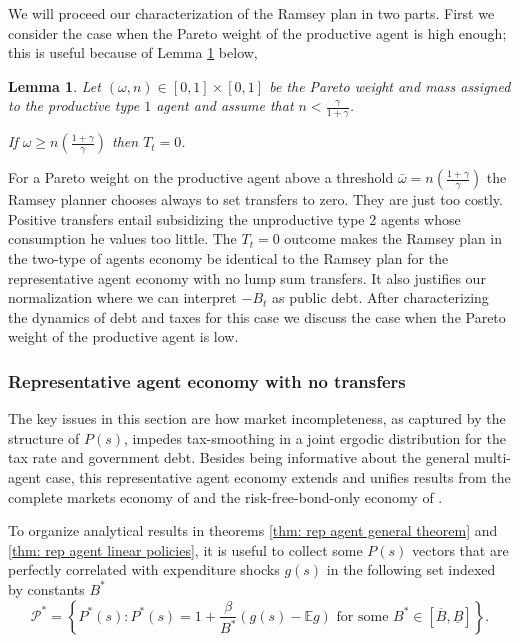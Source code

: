 \documentclass[thmsb,11pt]{article}
\newtheorem{lemma}{Lemma}
\begin{document}
We will proceed our characterization of the Ramsey plan in two parts. First we consider the case when the Pareto weight of the productive agent is high enough; this is useful because of Lemma \ref{lemma threshold} below,
\begin{lemma}
\label{lemma threshold}
Let $(\omega,n) \in [0,1] \times [0,1]$ be the Pareto weight and mass assigned to the  productive type $1$ agent and assume that $n<\frac{\gamma}{1+\gamma}$. 

If $\omega\geq n \left(\frac{1+\gamma}{\gamma}\right)$ then $T_t=0$.  

\end{lemma}

For a Pareto weight on the productive agent above a threshold $\bar{\omega}=n\left(\frac{1+\gamma}{\gamma}\right)$ the Ramsey  planner chooses always to set transfers to zero.
They are just too costly.      Positive  transfers  entail subsidizing the unproductive type 2 agents
whose consumption he values too little. The $T_t = 0$ outcome  makes  the Ramsey  plan
in the two-type of agents economy be  identical to the Ramsey plan for the representative agent economy with no lump sum transfers. It also justifies our normalization where we can interpret $-B_t$ as public debt. After characterizing the dynamics of debt and taxes for this case we discuss the case when the Pareto weight of the productive agent is low. 
  
\subsubsection{Representative agent economy with no transfers}

The key issues in this section are how market incompleteness, as captured by the structure of $P(s)$, impedes  tax-smoothing  in a joint ergodic distribution for the tax rate and government debt. Besides being informative about the general multi-agent case, this representative agent  economy  extends and unifies  results from the complete markets economy of \cite{LucasJr.1983} and the risk-free-bond-only economy of  \citep{Aiyagari2002}. 


To organize analytical results in theorems \ref{thm: rep agent general theorem} and \ref{thm: rep agent linear policies}, it is useful to  collect some  $P(s)$ vectors that are perfectly correlated with expenditure shocks $g(s)$ in the
following  set %
 indexed by  constants $B^*$  %
\begin{equation}\label{eqn:setP}
 \mathcal{P}^*=\left\{P^*(s): P^*(s) = 1+ \frac{\beta}{ B^*}(g(s) - \mathbb{E} g) \text{ for some } B^*\in[\overline{B},\underline{B}] \right\}.
 \end{equation}
\end{document}
